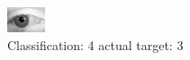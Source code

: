 \begin{figure}[h!]
\begin{center}
\includegraphics[width=0.60\columnwidth]{figures/ID2858_class_4_target_3.png}
\end{center}
\caption{ Classification: 4 actual target: 3}
\label{fig:ID2858_class_4_target_3}
\end{figure}
